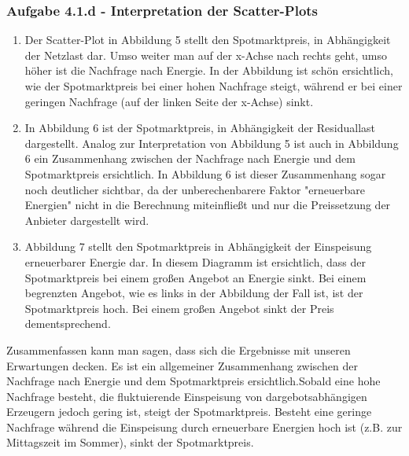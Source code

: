 \documentclass[a4paper,12pt]{article}
\begin{document}
	\subsubsection{Aufgabe 4.1.d - Interpretation der Scatter-Plots}
	\label{sec:Ergebnisse41d}
	\begin{enumerate}
		\item Der Scatter-Plot in Abbildung 5 stellt den Spotmarktpreis, in Abhängigkeit der Netzlast dar.\newline
		Umso weiter man auf der x-Achse nach rechts geht, umso höher ist die Nachfrage nach Energie. In der Abbildung ist schön ersichtlich, wie der Spotmarktpreis bei einer hohen Nachfrage steigt, während er bei einer geringen Nachfrage (auf der linken Seite der x-Achse) sinkt.
		\item In Abbildung 6 ist der Spotmarktpreis, in Abhängigkeit der Residuallast dargestellt.\newline
		Analog zur Interpretation von Abbildung 5 ist auch in Abbildung 6 ein Zusammenhang zwischen der Nachfrage nach Energie und dem Spotmarktpreis ersichtlich. In Abbildung 6 ist dieser Zusammenhang sogar noch deutlicher sichtbar, da der unberechenbarere Faktor "erneuerbare Energien" nicht in die Berechnung miteinfließt und nur die Preissetzung der Anbieter dargestellt wird.
		\item Abbildung 7 stellt den Spotmarktpreis in Abhängigkeit der Einspeisung erneuerbarer Energie dar.\newline
		In diesem Diagramm ist ersichtlich, dass der Spotmarktpreis bei einem großen Angebot an Energie sinkt. Bei einem begrenzten Angebot, wie es links in der Abbildung der Fall ist, ist der Spotmarktpreis hoch. Bei einem großen Angebot sinkt der Preis dementsprechend.
	\end{enumerate}
	Zusammenfassen kann man sagen, dass sich die Ergebnisse mit unseren Erwartungen decken. Es ist ein allgemeiner Zusammenhang zwischen der Nachfrage nach Energie und dem Spotmarktpreis ersichtlich.\newline Sobald eine hohe Nachfrage besteht, die fluktuierende Einspeisung von dargebotsabhängigen Erzeugern jedoch gering ist, steigt der Spotmarktpreis.\newline
	Besteht eine geringe Nachfrage während die Einspeisung durch erneuerbare Energien hoch ist (z.B. zur Mittagszeit im Sommer), sinkt der Spotmarktpreis.
	\newpage
	\listoffigures
\end{document}
